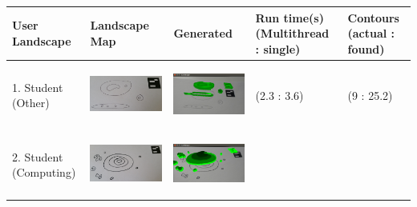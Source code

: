 \documentclass[11pt]{article}
\begin{document}
\newpage
\begin{landscape}
\centering
\begin{longtable}{p{}| p{}| p{} | p{} |p{}}
\hline
User Landscape 		& Landscape Map 			& Generated 	& Run time(s) (Multithread : single) & Contours (actual : found)\\
\hline
1. Student (Other) & \begin{center}\includegraphics[scale=0.5]{pics/usertesting/1.png}\end{center} 
							& \begin{center}\includegraphics[scale=0.5]{pics/usertesting/1render.png}\end{center} 
							& (2.3 : 3.6)
							& (9 : 25.2)\\
\hline
2. Student (Computing) & \begin{center}\includegraphics[scale=0.5]{pics/usertesting/2.png}\end{center} 
							& \begin{center}\includegraphics[scale=0.5]{pics/usertesting/2render.png}\end{center} 

\end{longtable}
\end{landscape}
\end{document}
